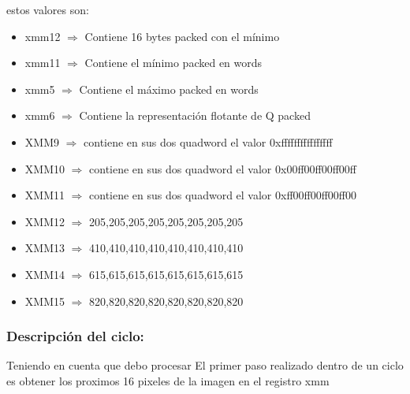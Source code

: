 estos valores son:
\begin{itemize}
  \item xmm12 $\Rightarrow$ Contiene 16 bytes packed con el mínimo
  \item xmm11 $\Rightarrow$ Contiene el mínimo packed en words
  \item xmm5 $\Rightarrow$ Contiene el máximo packed en words
  \item xmm6 $\Rightarrow$ Contiene la representación flotante de Q packed
  	\item XMM9 $\Rightarrow$ contiene en sus dos quadword el valor 0xffffffffffffffff
	\item XMM10 $\Rightarrow$ contiene en sus dos quadword el valor 0x00ff00ff00ff00ff
	\item XMM11 $\Rightarrow$ contiene en sus dos quadword el valor 0xff00ff00ff00ff00
	\item XMM12 $\Rightarrow$ 205,205,205,205,205,205,205,205
	\item XMM13 $\Rightarrow$ 410,410,410,410,410,410,410,410
	\item XMM14 $\Rightarrow$ 615,615,615,615,615,615,615,615
	\item XMM15 $\Rightarrow$ 820,820,820,820,820,820,820,820 
\end{itemize}

\subsubsection{Descripción del ciclo:}
Teniendo en cuenta que debo procesar 
El primer paso realizado dentro de un ciclo es obtener los proximos 16 pixeles de la imagen en el registro xmm